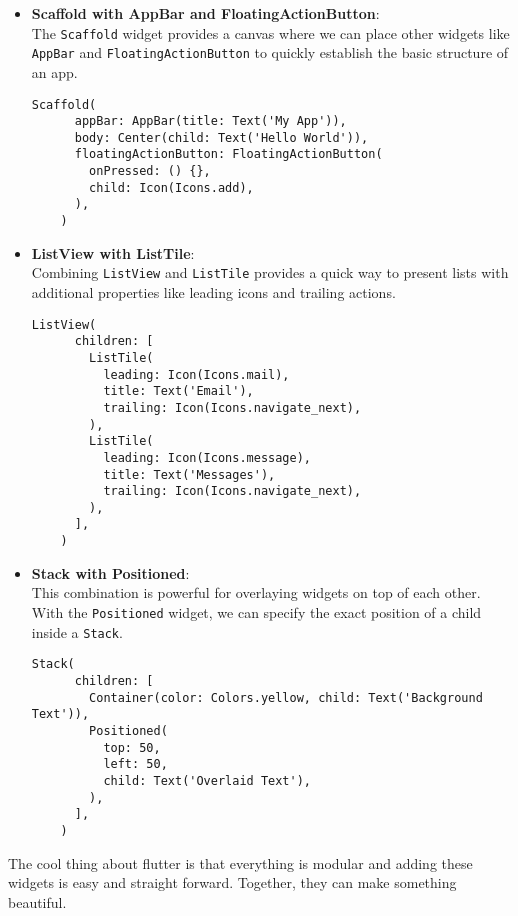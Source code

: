 \documentclass{article}
\begin{document}
\begin{itemize}
    \item \textbf{Scaffold with AppBar and FloatingActionButton}: \\ 
    The \texttt{Scaffold} widget provides a canvas where we can place other widgets like \texttt{AppBar} and \texttt{FloatingActionButton} to quickly establish the basic structure of an app.
		\begin{lstlisting}[style=dartstyle]
    Scaffold(
      appBar: AppBar(title: Text('My App')),
      body: Center(child: Text('Hello World')),
      floatingActionButton: FloatingActionButton(
        onPressed: () {},
        child: Icon(Icons.add),
      ),
    )
    \end{lstlisting}

    \item \textbf{ListView with ListTile}: \\
    Combining \texttt{ListView} and \texttt{ListTile} provides a quick way to present lists with additional properties like leading icons and trailing actions.
		\begin{lstlisting}[style=dartstyle]
    ListView(
      children: [
        ListTile(
          leading: Icon(Icons.mail),
          title: Text('Email'),
          trailing: Icon(Icons.navigate_next),
        ),
        ListTile(
          leading: Icon(Icons.message),
          title: Text('Messages'),
          trailing: Icon(Icons.navigate_next),
        ),
      ],
    )
    \end{lstlisting}

    \item \textbf{Stack with Positioned}: \\
    This combination is powerful for overlaying widgets on top of each other. With the \texttt{Positioned} widget, we can specify the exact position of a child inside a \texttt{Stack}.
		\begin{lstlisting}[style=dartstyle]
    Stack(
      children: [
        Container(color: Colors.yellow, child: Text('Background Text')),
        Positioned(
          top: 50,
          left: 50,
          child: Text('Overlaid Text'),
        ),
      ],
    )
    \end{lstlisting}
\end{itemize}

The cool thing about flutter is that everything is modular and adding these widgets is easy and straight forward. Together, they can make something beautiful.
\end{document}
